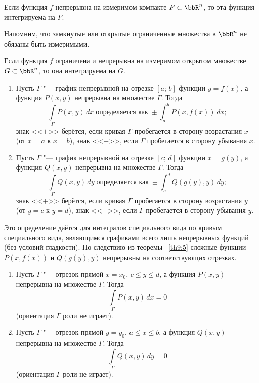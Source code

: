 \begin{thm} \label{th19:5}
Если функция $f$ непрерывна на измеримом компакте $F \subset \bbR^n$, то эта функция интегрируема на $F$.
\end{thm}

\begin{notion}
Напомним, что замкнутые или открытые ограниченные множества в $\bbR^n$ не обязаны быть измеримыми.
\end{notion}

\begin{thm} \label{th19:9}
Если функция $f$ ограничена и непрерывна на измеримом открытом множестве $G \subset \bbR^n$, то она интегрируема на $G$.
\end{thm}

\begin{defn} \label{df19:6}
\begin{enumerate}
\item Пусть $\Gamma$ "--- график непрерывной на отрезке $[a;\,b]$ функции $y = f(x)$, а функция $P(x,y)$ непрерывна на множестве $\Gamma$. Тогда
$$
\int\limits_{\Gamma} P(x,y)\,dx \; \text{определяется как} \; \pm \int_a^b P(x, f(x))\,dx;
$$
знак <<$+$>> берётся, если кривая $\Gamma$ пробегается в сторону возрастания $x$ (от $x = a$ к $x = b$), знак <<$-$>>, если $\Gamma$ пробегается в сторону убывания $x$.

\item Пусть $\Gamma$ "--- график непрерывной на отрезке $[c;\,d]$ функции $x = g(y)$, а функция $Q(x,y)$ непрерывна на множестве $\Gamma$. Тогда
$$
\int\limits_{\Gamma} Q(x,y)\,dy \; \text{определяется как} \; \pm \int_c^d Q(g(y), y)\,dy;
$$
знак <<$+$>> берётся, если кривая $\Gamma$ пробегается в сторону возрастания $y$ (от $y = c$ к $y = d$), знак <<$-$>>, если $\Gamma$ пробегается в сторону убывания $y$.
\end{enumerate}
\end{defn}

\begin{notion}
Это определение даётся для интегралов специального вида по кривым специального вида, являющимся графиками всего лишь непрерывных функций (без условий гладкости). По следствию из теоремы ~\ref{th9:5} сложные функции $P(x, f(x))$ и $Q(g(y), y)$ непрерывны на соответствующих отрезках.
\end{notion}

\begin{lemm} \label{lm19:8}
\begin{enumerate}
\item Пусть $\Gamma$ "--- отрезок прямой $x = x_0$, $c \le y \le d$, а функция $P(x, y)$ непрерывна на множестве $\Gamma$. Тогда
$$
\int\limits_{\Gamma} P(x, y)\,dx = 0
$$
(ориентация $\Gamma$ роли не играет).

\item Пусть $\Gamma$ "--- отрезок прямой $y = y_0$, $a \le x \le b$, а функция $Q(x, y)$ непрерывна на множестве $\Gamma$. Тогда
$$
\int\limits_{\Gamma} Q(x, y)\,dy = 0
$$
(ориентация $\Gamma$ роли не играет).
\end{enumerate}
\end{lemm}

